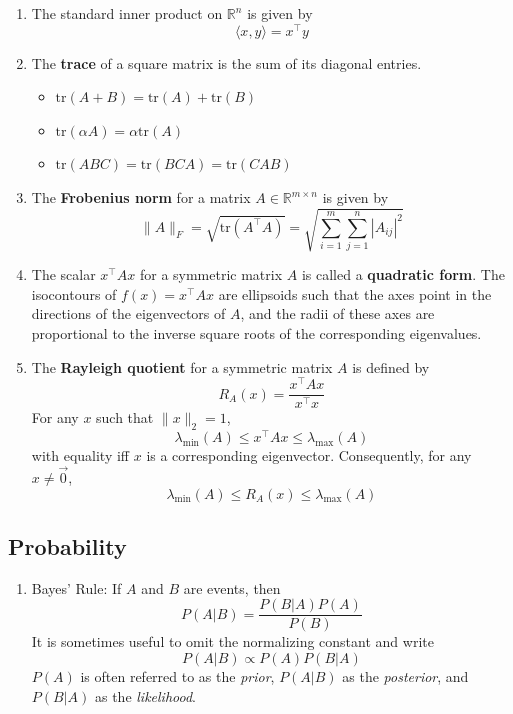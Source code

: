 \documentclass[10pt]{article}
\begin{document}
\begin{multicols}{2}
\begin{addmargin}[0.8em]{0.5em}
\begin{enumerate}[label=(\alph*)]
        \item The standard inner product on $\mathbb{R}^n$ is given by
        $$
        \langle x, y \rangle = x^\top y
        $$
        
        \item The \textbf{trace} of a square matrix is the sum of its diagonal entries.
        \begin{itemize}
        \item $\text{tr}(A + B) = \text{tr}(A) + \text{tr}(B)$
        \item $\text{tr}(\alpha A) = \alpha \text{tr}(A)$
        \item $\text{tr}(ABC) = \text{tr}(BCA) = \text{tr}(CAB)$
        \end{itemize}
        
        \item The \textbf{Frobenius norm} for a matrix $A \in \mathbb{R}^{m \times n}$ is given by $$\| A \|_F = \sqrt{\text{tr}(A^\top A)} = \sqrt{\sum_{i=1}^{m} \sum_{j=1}^{n} |A_{ij}|^2}$$
        
        \item The scalar $x^\top A x$ for a symmetric matrix $A$ is called a \textbf{quadratic form}. The isocontours of $f(x) = x^\top Ax$ are ellipsoids such that the axes point in the directions of the eigenvectors of $A$, and the radii of these axes are proportional to the inverse square roots of the corresponding eigenvalues.
        
        \item The \textbf{Rayleigh quotient} for a symmetric matrix $A$ is defined by 
        $$
        R_A(x) = \frac{x^\top A x}{x^\top x}
        $$
        For any $x$ such that $\| x \|_2=1$, 
        $$
        \lambda_{\text{min}}(A) \leq x^\top A x \leq \lambda_{\text{max}}(A)
        $$
        with equality iff $x$ is a corresponding eigenvector. Consequently, for any $x \neq \vec{0}$,
        $$
        \lambda_{\text{min}}(A) \leq R_A(x) \leq \lambda_{\text{max}}(A)
        $$
    \end{enumerate}
    \vspace{-0.2cm}
    \subsection{Probability}
    \vspace{-0.2cm}
    \begin{enumerate}[label=(\alph*)]
    \item Bayes' Rule: If $A$ and $B$ are events, then
    $$
    P(A | B) = \frac{P(B|A)P(A)}{P(B)}
    $$
    It is sometimes useful to omit the normalizing constant and write
    $$
    P(A|B) \propto P(A)P(B|A)
    $$
    $P(A)$ is often referred to as the \textit{prior}, $P(A|B)$ as the \textit{posterior}, and $P(B|A)$ as the \textit{likelihood}.
    

\end{enumerate}
\end{addmargin}
\end{multicols}
\end{document}
